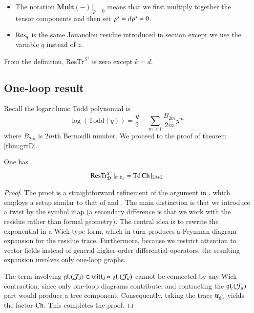 \documentclass[main.tex]{subfiles}
\begin{document}
\begin{definition}
\begin{itemize}
      \item[(iv)] The notation $\mathbf{Mult}\left(-\right)|_{p=0}$ means that we first multiply together the tensor components and then set $p^{\textbf{\texttt{\tiny{s}}}}=dp^{\textbf{\texttt{\tiny{s}}}}=0$.
      \item[(v)] $\operatorname{Res}_q$ is the same Jouanolou residue introduced in section \cite[section 2.1]{GWvir2d} except we use the
        variable $q$ instead of $z$.
      \end{itemize}
\end{definition}
From the definition, $\mathrm{ResTr}^{S^1}$ is zero except $k=d$.

\subsection{One-loop result}
Recall the logarithmic Todd polynomial is
\[
\log(\mathrm{Todd}(y))=\frac{y}{2}-\sum_{m\geq 1}\frac{B_{2m}}{2m}y^m
\]
where $B_{2m}$ is $2m$th Bernoulli number.
We proceed to the proof of theorem \ref{thm:grrD}.
\begin{theorem*}[\ref{thm:grrD}]
  One has 
  \begin{equation}\label{}
    \operatorname{ResTr}_{\mathcal D}^{S^1}|_{\mathfrak{witt}_d} = \operatorname{Td}\operatorname{Ch}|_{2d+2}
  \end{equation}
\end{theorem*}

\begin{proof}
 The proof is a straightforward refinement of the argument in \cite{GWWchiral}, which employs a setup similar to that of \cite{FFS} and \cite{GLX}. The main distinction is that we introduce a twist by the symbol map (a secondary difference is that we work with the residue rather than formal geometry). The central idea is to rewrite the exponential in a Wick-type form, which in turn produces a Feynman diagram expansion for the residue trace. Furthermore, because we restrict attention to vector fields instead of general higher-order differential operators, the resulting expansion involves only one-loop graphs.

The term involving $\mathfrak{gl}_r(\mathcal J_d)\subset\mathfrak{witt}_d\ltimes \mathfrak{gl}_r(\mathcal J_d)$ cannot be connected by any Wick contraction, since only one-loop diagrams contribute, and contracting the $\mathfrak{gl}_r(\mathcal J_d)$ part would produce a tree component. Consequently, taking the trace $\operatorname{tr}_{\mathfrak{gl}_r}$ yields the factor $\operatorname{Ch}$. This completes the proof.


\end{proof}
\end{document}
